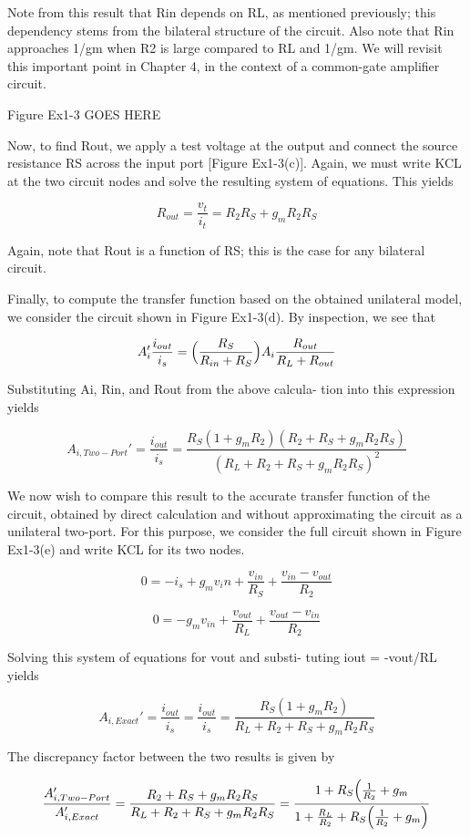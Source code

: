 \documentclass[
  11pt,
  letterpaper,
  abstract]{scrbook}
\begin{document}
Note from this result that Rin depends on RL, as mentioned previously;
this dependency stems from the bilateral structure of the circuit. Also
note that Rin approaches 1/gm when R2 is large compared to RL and 1/gm.
We will revisit this important point in Chapter 4, in the context of a
common-gate amplifier circuit.

Figure Ex1-3 GOES HERE

Now, to find Rout, we apply a test voltage at the output and connect the
source resistance RS across the input port {[}Figure Ex1-3(c){]}. Again,
we must write KCL at the two circuit nodes and solve the resulting
system of equations. This yields

\[
R_{out} = \frac{v_t}{i_t} = R_2 R_S + g_m R_2 R_S
\]

Again, note that Rout is a function of RS; this is the case for any
bilateral circuit.

Finally, to compute the transfer function based on the obtained
unilateral model, we consider the circuit shown in Figure Ex1-3(d). By
inspection, we see that

\[
A_i' \frac{i_{out}}{i_s} = \Bigl( \frac{R_S}{R_{in} + R_S} \Bigr) A_i \frac{R_{out}}{R_L + R_{out}}
\]

Substituting Ai, Rin, and Rout from the above calcula- tion into this
expression yields

\[
A_{i, Two-Port}' = \frac{i_{out}}{i_s} = \frac{R_S(1 + g_m R_2)(R_2 + R_S + g_m R_2 R_S)}{(R_L + R_2 + R_S + g_m R_2 R_S)^2}
\]

We now wish to compare this result to the accurate transfer function of
the circuit, obtained by direct calculation and without approximating
the circuit as a unilateral two-port. For this purpose, we consider the
full circuit shown in Figure Ex1-3(e) and write KCL for its two nodes.

\[
0 = - i_s + g_m v_in + \frac{v_{in}}{R_S} + \frac{v_{in} - v_{out}}{R_2}
\]

\[
0 = -g_m v_{in} + \frac{v_{out}}{R_L} + \frac{v_{out} - v_{in}}{R_2}
\]

Solving this system of equations for vout and substi- tuting iout =
-vout/RL yields

\[
A_{i, Exact}' = \frac{i_{out}}{i_s} = \frac{i_{out}}{i_s} = 
\frac{R_S (1 + g_m R_2)}{R_L + R_2 + R_S + g_m R_2 R_S}
\]

The discrepancy factor between the two results is given by

\[
\frac{A_{i, Two-Port}'}{A_{i, Exact}'} = \frac{R_2 + R_S + g_m R_2 R_S}{R_L + R_2 + R_S + g_m R_2 R_S} = \frac{1 + R_S \Bigl(\frac{1}{R_2} + g_m}{1 + \frac{R_L}{R_2} + R_S \Bigl(\frac{1}{R_2} + g_m \Bigr)}
\]
\end{document}
